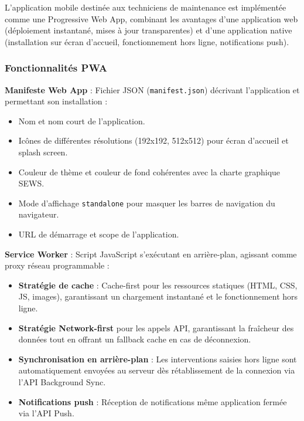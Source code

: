 L'application mobile destinée aux techniciens de maintenance est implémentée comme une Progressive Web App, combinant les avantages d'une application web (déploiement instantané, mises à jour transparentes) et d'une application native (installation sur écran d'accueil, fonctionnement hors ligne, notifications push).

\subsubsection{Fonctionnalités PWA}

\textbf{Manifeste Web App} : Fichier JSON (\texttt{manifest.json}) décrivant l'application et permettant son installation :

\begin{itemize}
    \item Nom et nom court de l'application.
    \item Icônes de différentes résolutions (192x192, 512x512) pour écran d'accueil et splash screen.
    \item Couleur de thème et couleur de fond cohérentes avec la charte graphique SEWS.
    \item Mode d'affichage \texttt{standalone} pour masquer les barres de navigation du navigateur.
    \item URL de démarrage et scope de l'application.
\end{itemize}

\textbf{Service Worker} : Script JavaScript s'exécutant en arrière-plan, agissant comme proxy réseau programmable :

\begin{itemize}
    \item \textbf{Stratégie de cache} : Cache-first pour les ressources statiques (HTML, CSS, JS, images), garantissant un chargement instantané et le fonctionnement hors ligne.
    \item \textbf{Stratégie Network-first} pour les appels API, garantissant la fraîcheur des données tout en offrant un fallback cache en cas de déconnexion.
    \item \textbf{Synchronisation en arrière-plan} : Les interventions saisies hors ligne sont automatiquement envoyées au serveur dès rétablissement de la connexion via l'API Background Sync.
    \item \textbf{Notifications push} : Réception de notifications même application fermée via l'API Push.
\end{itemize}

